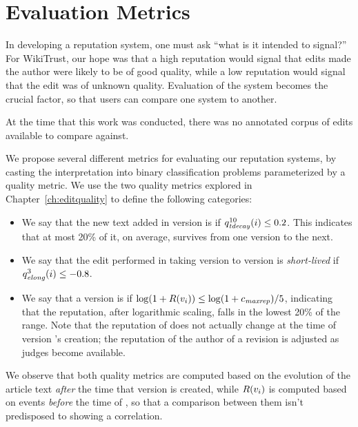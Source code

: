 \section{Evaluation Metrics}
\label{sec:rep-eval}

In developing a reputation system, one must ask
``what is it intended to signal?''
For WikiTrust, our hope was that a high reputation
would signal that edits made the author were likely
to be of good quality, while a low reputation would
signal that the edit was of unknown quality.
Evaluation of the system becomes the crucial
factor, so that users can compare one system to another.


At the time that this work was conducted, there was
no annotated corpus of edits available to compare against.

We propose several different metrics for
evaluating our reputation systems, by casting the interpretation
into binary classification problems parameterized by a
quality metric.
We use the two quality metrics explored in Chapter~\ref{ch:editquality}
to define the following categories:
\begin{itemize} 
\item We say that the new text added in version 
  is  if $\quality{tdecay}{10}{i} \leq 0.2$.
  This indicates that at most 20\% of it, on
  average, survives from one version to the next. 

\item We say that the edit performed in taking version
   to version 
  is \textit{short-lived} if
  $\quality{elong}{3}{i} \leq -0.8$.

\item We say that a version  is  if
  $\log (1+R(v_{i})) \leq \log(1+{c_{{\text{\textit{maxrep}}}}}) / 5$, indicating that
  the reputation, after logarithmic scaling, falls in the lowest 20\% of
  the range.
  Note that the reputation of  does not actually
  change at the time of version 's creation; the reputation
  of the author of a revision
  is adjusted as judges become available.

\end{itemize}
We observe that both quality metrics are computed based on the
evolution of the article text \textit{after} the time that
version  is created, while $R(v_{i})$ is
computed based on events \textit{before} the time of ,
so that a comparison between them isn't predisposed to showing
a correlation.



